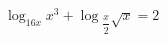 \begin{ex}[type=equation]
	\begin{condition}
		$\log_{16x} x^3 + \log$\tiny$_{\dfrac{x}{2}}$\normalsize$\sqrt{x} = 2$
	\end{condition}
\end{ex}